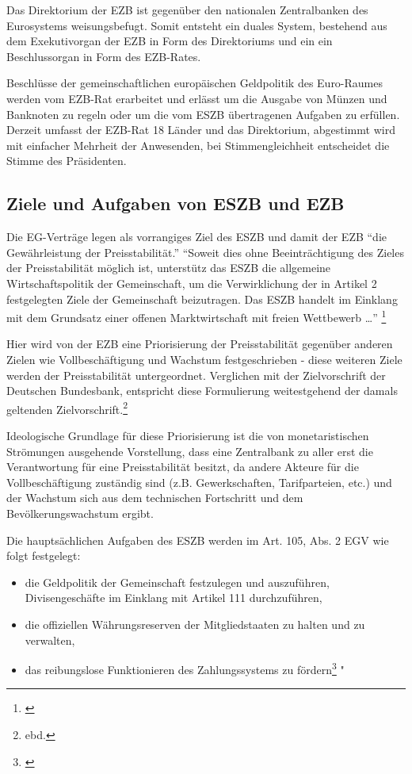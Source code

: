 \documentclass[
  onecolumn,
  a4paper,
  abstracton,
  parskip=half
  ,final
  ]{scrartcl}
\begin{document}
Das Direktorium der EZB ist gegen{\"u}ber den nationalen Zentralbanken des Eurosystems weisungsbefugt. Somit entsteht ein duales System, bestehend aus dem Exekutivorgan der EZB in Form des Direktoriums und ein ein Beschlussorgan in Form des EZB-Rates.
 
Beschl{\"u}sse der gemeinschaftlichen europ{\"a}ischen Geldpolitik des Euro-Raumes werden vom EZB-Rat erarbeitet und erl{\"a}sst um die Ausgabe von M{\"u}nzen und Banknoten zu regeln oder um die vom ESZB {\"u}bertragenen Aufgaben zu erf{\"u}llen. \citep[vgl.][S.553]{Basseler2010} 
Derzeit umfasst der EZB-Rat 18 L{\"a}nder und das Direktorium, abgestimmt wird mit einfacher Mehrheit der Anwesenden, bei Stimmengleichheit entscheidet die Stimme des Pr{\"a}sidenten.


\subsection{Ziele und Aufgaben von ESZB und EZB}
Die EG-Vertr{\"a}ge legen als vorrangiges Ziel des ESZB und damit der EZB "`die Gew{\"a}hrleistung der Preisstabilit{\"a}t."'
"`Soweit dies ohne Beeintr{\"a}chtigung des Zieles der Preisstabilit{\"a}t m{\"o}glich ist, unterst{\"u}tz das ESZB die allgemeine Wirtschaftspolitik der Gemeinschaft, um die Verwirklichung der in Artikel 2 festgelegten Ziele der Gemeinschaft beizutragen. Das ESZB handelt im Einklang mit dem Grundsatz einer offenen Marktwirtschaft mit freien Wettbewerb \ldots"' \footnote[48]{\citep[vgl.][S.554]{Basseler2010}}

Hier wird von der EZB eine Priorisierung der Preisstabilit{\"a}t gegen{\"u}ber anderen Zielen wie Vollbesch{\"a}ftigung und Wachstum festgeschrieben - diese weiteren Ziele werden der Preisstabilit{\"a}t untergeordnet. Verglichen mit der Zielvorschrift der Deutschen Bundesbank, entspricht diese Formulierung weitestgehend der damals geltenden Zielvorschrift.\footnote[49]{ebd.}

Ideologische Grundlage f{\"u}r diese Priorisierung ist die von monetaristischen Str{\"o}mungen ausgehende Vorstellung, dass eine Zentralbank zu aller erst die Verantwortung f{\"u}r eine Preisstabilit{\"a}t besitzt, da andere Akteure f{\"u}r die Vollbesch{\"a}ftigung zust{\"a}ndig sind (z.B. Gewerkschaften, Tarifparteien, etc.) und der Wachstum sich aus dem technischen Fortschritt und dem Bev{\"o}lkerungswachstum ergibt.

Die haupts{\"a}chlichen Aufgaben des ESZB werden im Art. 105, Abs. 2 EGV wie folgt festgelegt:
\begin{itemize}
  \item{die Geldpolitik der Gemeinschaft festzulegen und auszuf{\"u}hren, Divisengesch{\"a}fte im Einklang mit Artikel 111 durchzuf{\"u}hren,}
  \item{die offiziellen W{\"a}hrungsreserven der Mitgliedstaaten zu halten und zu verwalten,}
  \item{das reibungslose Funktionieren des Zahlungssystems zu f{\"o}rdern}\footnote[50]{\citep[vgl.][S.555]{Basseler2010}} "
\end{itemize} 
\end{document}
